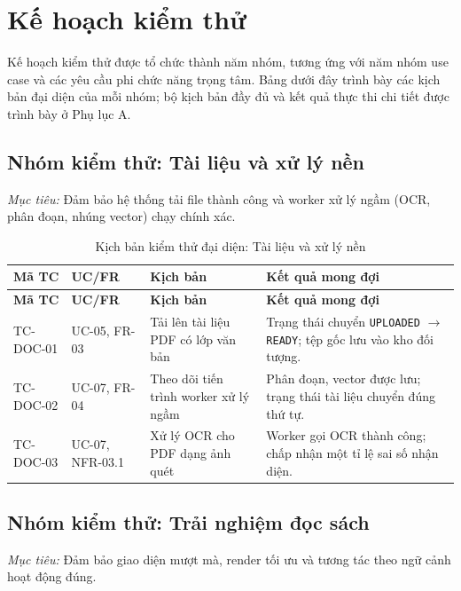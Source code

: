 \section{Kế hoạch kiểm thử}
Kế hoạch kiểm thử được tổ chức thành năm nhóm, tương ứng với năm nhóm use case và các yêu cầu phi chức năng trọng tâm. Bảng dưới đây trình bày các kịch bản đại diện của mỗi nhóm; bộ kịch bản đầy đủ và kết quả thực thi chi tiết được trình bày ở Phụ lục A.

\subsection{Nhóm kiểm thử: Tài liệu và xử lý nền}
\textit{Mục tiêu:} Đảm bảo hệ thống tải file thành công và worker xử lý ngầm (OCR, phân đoạn, nhúng vector) chạy chính xác.

\begin{longtable}{|C{0.15\textwidth}|C{0.15\textwidth}|L{0.27\textwidth}|L{0.31\textwidth}|}
\caption{Kịch bản kiểm thử đại diện: Tài liệu và xử lý nền}\\
\hline
\textbf{Mã TC} & \textbf{UC/FR} & \textbf{Kịch bản} & \textbf{Kết quả mong đợi} \\\hline
\endfirsthead
\hline
\textbf{Mã TC} & \textbf{UC/FR} & \textbf{Kịch bản} & \textbf{Kết quả mong đợi} \\\hline
\endhead
\mbox{TC-DOC-01} & UC-05, FR-03 & Tải lên tài liệu PDF có lớp văn bản & Trạng thái chuyển \texttt{UPLOADED} $\to$ \texttt{READY}; tệp gốc lưu vào kho đối tượng. \\\hline
\mbox{TC-DOC-02} & UC-07, FR-04 & Theo dõi tiến trình worker xử lý ngầm & Phân đoạn, vector được lưu; trạng thái tài liệu chuyển đúng thứ tự. \\\hline
\mbox{TC-DOC-03} & UC-07, NFR-03.1 & Xử lý OCR cho PDF dạng ảnh quét & Worker gọi OCR thành công; chấp nhận một tỉ lệ sai số nhận diện. \\\hline
\end{longtable}

\subsection{Nhóm kiểm thử: Trải nghiệm đọc sách}
\textit{Mục tiêu:} Đảm bảo giao diện mượt mà, render tối ưu và tương tác theo ngữ cảnh hoạt động đúng.

